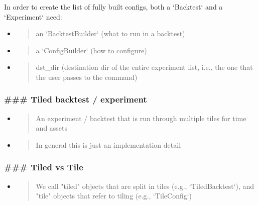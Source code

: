 \documentclass[11pt, reqno]{amsart}
\begin{document}
In order to create the list of fully built configs, both a `Backtest`
and a `Experiment` need:

\begin{itemize}
\item
  \begin{quote}
  an `BacktestBuilder` (what to run in a backtest)
  \end{quote}
\item
  \begin{quote}
  a `ConfigBuilder` (how to configure)
  \end{quote}
\item
  \begin{quote}
  dst\_dir (destination dir of the entire experiment list, i.e., the one
  that the user passes to the command)
  \end{quote}
\end{itemize}

\hypertarget{tiled-backtest-experiment}{%
\subsubsection{\texorpdfstring{\textbf{\#\#\# Tiled backtest /
experiment}}{\#\#\# Tiled backtest / experiment}}\label{tiled-backtest-experiment}}

\begin{itemize}
\item
  \begin{quote}
  An experiment / backtest that is run through multiple tiles for time
  and assets
  \end{quote}
\item
  \begin{quote}
  In general this is just an implementation detail
  \end{quote}
\end{itemize}

\hypertarget{tiled-vs-tile}{%
\subsubsection{\texorpdfstring{\textbf{\#\#\# Tiled vs
Tile}}{\#\#\# Tiled vs Tile}}\label{tiled-vs-tile}}

\begin{itemize}
\item
  \begin{quote}
  We call "tiled" objects that are split in tiles (e.g.,
  `TiledBacktest`), and "tile" objects that refer to tiling (e.g.,
  `TileConfig`)
  \end{quote}
\end{itemize}
\end{document}
